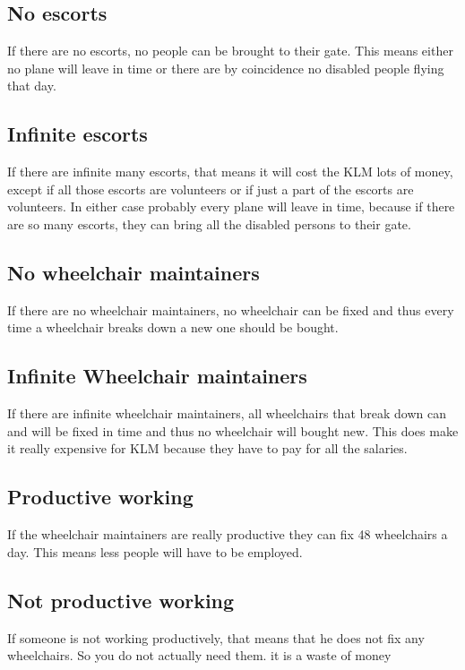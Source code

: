 \documentclass[a4paper, 11pt, notitlepage]{report}
\begin{document}
\subsection{No escorts}
If there are no escorts, no people can be brought to their gate. This means either no plane will leave in time or there are by coincidence no disabled people flying that day.
\subsection{Infinite escorts}
If there are infinite many escorts, that means it will cost the KLM lots of money, except if all those escorts are volunteers or if just a part of the escorts are volunteers. In either case probably every plane will leave in time, because if there are so many escorts, they can bring all the disabled persons to their gate.
\subsection{No wheelchair maintainers}
If there are no wheelchair maintainers, no wheelchair can be fixed and thus every time a wheelchair breaks down a new one should be bought.
\subsection{Infinite Wheelchair maintainers}
If there are infinite wheelchair maintainers, all wheelchairs that break down can and will be fixed in time and thus no wheelchair will bought new. This does make it really expensive for KLM because they have to pay for all the salaries.
\subsection{Productive working}
If the wheelchair maintainers are really productive they can fix 48 wheelchairs a day. This means less people will have to be employed.
\subsection{Not productive working}
If someone is not working productively, that means that he does not fix any wheelchairs. So you do not actually need them. it is a waste of money
\end{document}
